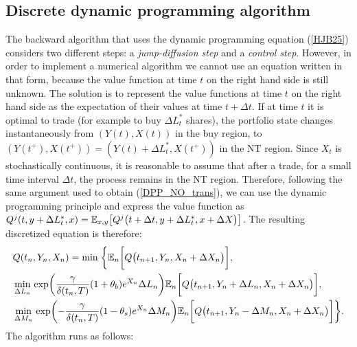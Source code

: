 \subsection{Discrete dynamic programming algorithm}\label{algorithm_Sect}
The backward algorithm that uses the dynamic programming equation (\ref{HJB25}) considers two different steps: 
a \emph{jump-diffusion step} and a \emph{control step}.
However, in order to implement a numerical algorithm we cannot use an equation written in that form,  
because the value function at time $t$ on the right hand side is still unknown.
The solution is to represent the value functions at time $t$ on the right hand side as the expectation of their values at time $t+\Delta t$. 
If at time $t$ it is optimal to trade (for example to buy $\Delta L_t^*$ shares), the portfolio state changes instantaneously from $(Y(t),X(t))$ in the buy region, 
to $(Y(t^+), X(t^+)) = (Y(t) + \Delta L_t^*, X(t^+))$ in the NT region. 
Since $X_t$ is stochastically continuous, it is reasonable to assume that after a trade, for a small time interval $\Delta t$, the process remains in the NT region. 
Therefore, following the same argument used to obtain (\ref{DPP_NO_trans}), we can use the dynamic programming principle and express the value function 
as $Q^j(t, y+\Delta L_t^*, x) = \mathbb{E}_{x,y} \bigl[ Q^j \bigl( t+\Delta t, y+\Delta L_t^*, x + \Delta X \bigr) \bigr]$.
The resulting discretized equation is therefore:
\begin{align}\label{HJB3}
 & Q(t_n,Y_n,X_n) = \min  
 \; \biggl\{ \mathbb{E}_n \biggl[ Q \bigl( t_{n+1}, Y_n, X_n + \Delta X_n \bigr) \biggr], \\ \nonumber
 & \min_{\Delta L_n} \, \exp \biggl(\frac{\gamma}{\delta(t_n,T)} (1+\theta_b) e^{X_n} \Delta L_n \biggr) 
 \mathbb{E}_n \biggl[ Q \bigl( t_{n+1}, Y_n+\Delta L_n, X_n + \Delta X_n \bigr) \biggr], \\ \nonumber
 & \min_{\Delta M_n} \, \exp \biggl(- \frac{\gamma}{\delta(t_n,T)} (1-\theta_s) e^{X_n} \Delta M_n \biggr)
 \mathbb{E}_n \biggl[ Q \bigl( t_{n+1}, Y_n-\Delta M_n, X_n + \Delta X_n \bigr) \biggr]
 \biggr\}.
\end{align}
The algorithm runs as follows:
